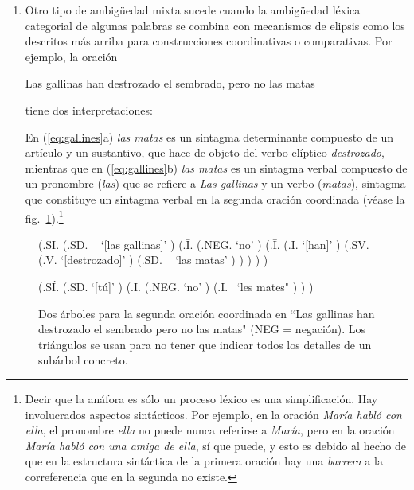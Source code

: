 \begin{enumerate}
\item Otro tipo de ambigüedad mixta sucede cuando la ambigüedad léxica categorial de algunas palabras se combina con mecanismos de elipsis como los descritos más arriba para construcciones coordinativas o comparativas. Por ejemplo, la oración \begin{exemple} Las gallinas han destrozado el sembrado, pero no las matas \end{exemple} tiene dos interpretaciones:  En (\ref{eq:gallines}a) \emph{las matas} es un sintagma determinante compuesto de un artículo y un sustantivo, que hace de objeto del verbo elíptico \emph{destrozado}, mientras que en (\ref{eq:gallines}b) \emph{las matas} es un sintagma verbal compuesto de un pronombre ({\em las}) que se refiere a \emph{Las gallinas} y un verbo ({\em matas}), sintagma que constituye un sintagma verbal en la segunda oración coordinada (véase la fig.~\ref{fg:mates}).\footnote{Decir que la anáfora es sólo un proceso léxico es una simplificación. Hay involucrados aspectos sintácticos. Por ejemplo, en la oración \emph{María habló con ella}, el pronombre \emph{ella} no puede nunca referirse a \emph{María}, pero en la oración \emph{María habló con una amiga de ella}, sí que puede, y esto es debido al hecho de que en la estructura sintáctica de la primera oración hay una \emph{barrera} a la correferencia que en la segunda no existe.} \end{enumerate} 

\begin{figure} \begin{center} \begin{parsetree} (.SI. (.SD. ~ `[las gallinas]' ) (.{\={I}}. (.NEG. `no' ) (.{\={I}}. (.I. `[han]' ) (.SV. (.V. `[destrozado]' ) (.SD. ~ `las matas' ) ) ) ) ) \end{parsetree} \end{center} \begin{center} \begin{parsetree} (.SÍ. (.SD. `[tú]' ) (.{\={I}}. (.NEG. `no' ) (.{\={I}}. ~`les mates" ) ) ) \end{parsetree} \end{center} \caption{Dos árboles para la segunda oración coordinada en ``Las gallinas han destrozado el sembrado pero no las matas" (NEG = negación). Los triángulos se usan para no tener que indicar todos los detalles de un subárbol concreto.} \label{fg:mates} \end{figure} 


